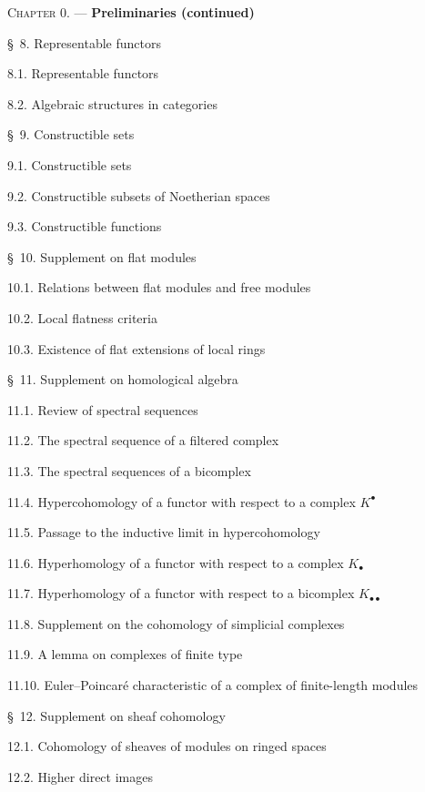 \begin{flushleft}
\textsc{Chapter 0.} --- \textbf{Preliminaries (continued)} 

\medskip
\S~8. Representable functors 

8.1. Representable functors 

8.2. Algebraic structures in categories 

\medskip
\S~9. Constructible sets 

9.1. Constructible sets 

9.2. Constructible subsets of Noetherian spaces 

9.3. Constructible functions 

\medskip
\S~10. Supplement on flat modules 

10.1. Relations between flat modules and free modules 

10.2. Local flatness criteria 

10.3. Existence of flat extensions of local rings 

\medskip
\S~11. Supplement on homological algebra 

11.1. Review of spectral sequences 

11.2. The spectral sequence of a filtered complex 

11.3. The spectral sequences of a bicomplex 

11.4. Hypercohomology of a functor with respect to a complex $K^\bullet$

11.5. Passage to the inductive limit in hypercohomology 

11.6. Hyperhomology of a functor with respect to a complex $K_\bullet$

11.7. Hyperhomology of a functor with respect to a bicomplex
$K_{\bullet\bullet}$ 

11.8. Supplement on the cohomology of simplicial complexes 

11.9. A lemma on complexes of finite type 

11.10. Euler--Poincaré characteristic of a complex of finite-length modules

\medskip
\S~12. Supplement on sheaf cohomology 

12.1. Cohomology of sheaves of modules on ringed spaces 

12.2. Higher direct images 


\end{flushleft}
